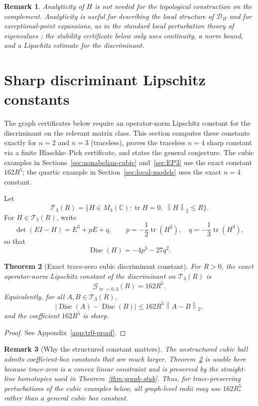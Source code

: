 \documentclass[11pt]{article}
\newtheorem{theorem}{Theorem}[section]
\newtheorem{remark}[theorem]{Remark}
\numberwithin{equation}{section}
\DeclareMathOperator{\Disc}{Disc}
\DeclareMathOperator{\tr}{tr}
\newcommand{\bbC}{\mathbb C}
\newcommand{\cD}{\mathcal D}
\newcommand{\cG}{\mathcal G}
\newcommand{\cT}{\mathcal T}
\newcommand{\norm}[1]{\left\|#1\right\|}
\begin{document}
\begin{remark}
Analyticity of $H$ is not needed for the topological construction on the
complement.  Analyticity is useful for describing the local structure of
$\cD_H$ and for exceptional-point expansions, as in the standard local
perturbation theory of eigenvalues \cite{Kato1995}; the stability certificate
below only uses continuity, a norm bound, and a Lipschitz estimate for the
discriminant.
\end{remark}


\section{Sharp discriminant Lipschitz constants}\label{sec:tr0constant}

The graph certificates below require an operator-norm Lipschitz constant for
the discriminant on the relevant matrix class.  This section computes these
constants exactly for $n=2$ and $n=3$ (traceless), proves the traceless
\(n=4\) sharp constant via a finite Blaschke--Pick certificate, and states the
general conjecture.  The cubic examples in
Sections~\ref{sec:nonabelian-cubic} and~\ref{sec:EP3} use the exact constant
\(162R^5\); the quartic example in Section~\ref{sec:local-models} uses the
exact \(n=4\) constant.

Let
\[
  \cT_3(R)=\{H\in M_3(\bbC):\tr H=0,\ \norm{H}_2\le R\}.
\]
For \(H\in\cT_3(R)\), write
\[
  \det(EI-H)=E^3+pE+q,
  \qquad
  p=-\frac12\tr(H^2),\quad q=-\frac13\tr(H^3),
\]
so that
\[
  \Disc(H)=-4p^3-27q^2.
\]

\begin{theorem}[Exact trace-zero cubic discriminant constant]\label{thm:tr0-exact}
For \(R>0\), the exact operator-norm Lipschitz constant of the discriminant
on \(\cT_3(R)\) is
\[
  \cG_{\tr=0,3}(R)=162R^5.
\]
Equivalently, for all \(A,B\in\cT_3(R)\),
\[
  |\Disc(A)-\Disc(B)|\le 162R^5\norm{A-B}_2,
\]
and the coefficient \(162R^5\) is sharp.
\end{theorem}

\begin{proof}
See Appendix~\ref{app:tr0-proof}.
\end{proof}

\begin{remark}[Why the structured constant matters]
The unstructured cubic ball admits coefficient-box constants that are much
larger.  Theorem~\ref{thm:tr0-exact} is usable here because trace-zero is a
convex linear constraint and is preserved by the straight-line homotopies
used in Theorem~\ref{thm:graph-stab}.  Thus, for trace-preserving
perturbations of the cubic examples below, all graph-level radii may use
\(162R_*^5\) rather than a general cubic box constant.
\end{remark}
\end{document}
